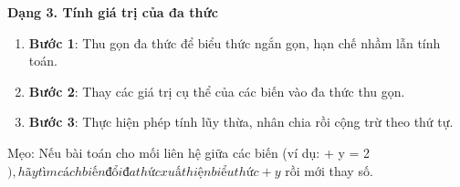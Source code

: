 \textbf{Dạng 3. Tính giá trị của đa thức}
\begin{enumerate}
\item \textbf{Bước 1}: Thu gọn đa thức để biểu thức ngắn gọn, hạn chế nhầm lẫn tính toán.
\item \textbf{Bước 2}: Thay các giá trị cụ thể của các biến vào đa thức thu gọn.
\item \textbf{Bước 3}: Thực hiện phép tính lũy thừa, nhân chia rồi cộng trừ theo thứ tự.
\end{enumerate}
Mẹo: Nếu bài toán cho mối liên hệ giữa các biến (ví dụ:  + y = 2$), hãy tìm cách biến đổi đa thức xuất hiện biểu thức +y$ rồi mới thay số.
